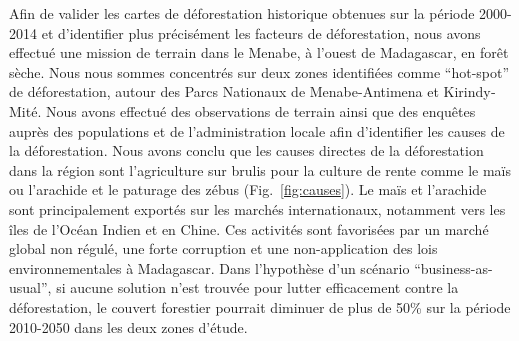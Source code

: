 \documentclass[12pt,]{article}
\begin{document}
Afin de valider les cartes de déforestation historique obtenues sur la
période 2000-2014 et d'identifier plus précisément les facteurs de
déforestation, nous avons effectué une mission de terrain dans le
Menabe, à l'ouest de Madagascar, en forêt sèche. Nous nous sommes
concentrés sur deux zones identifiées comme ``hot-spot'' de
déforestation, autour des Parcs Nationaux de Menabe-Antimena et
Kirindy‐Mité. Nous avons effectué des observations de terrain ainsi que
des enquêtes auprès des populations et de l'administration locale afin
d'identifier les causes de la déforestation. Nous avons conclu que les
causes directes de la déforestation dans la région sont l'agriculture
sur brulis pour la culture de rente comme le maïs ou l'arachide et le
paturage des zébus (Fig.~\ref{fig:causes}). Le maïs et l'arachide sont
principalement exportés sur les marchés internationaux, notamment vers
les îles de l'Océan Indien et en Chine. Ces activités sont favorisées
par un marché global non régulé, une forte corruption et une
non-application des lois environnementales à Madagascar. Dans
l'hypothèse d'un scénario ``business-as-usual'', si aucune solution
n'est trouvée pour lutter efficacement contre la déforestation, le
couvert forestier pourrait diminuer de plus de 50\% sur la période
2010-2050 dans les deux zones d'étude.
\end{document}
